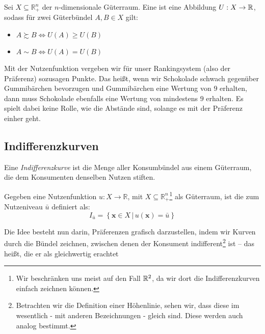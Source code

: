 \begin{definition} \label{def:nutzenfunktion}
	Sei $X \subseteq \mathbb{R}^n_+$ der $n$-dimensionale Güterraum. Eine  ist eine Abbildung $U: X \rightarrow \mathbb{R}$, sodass für zwei Güterbündel $A, B \in X$ gilt:
	\begin{itemize}
		\item $A \succsim B \iff U(A) \ge U(B)$
		\item $A \sim B \iff U(A) = U(B)$
	\end{itemize}
\end{definition}

Mit der Nutzenfunktion vergeben wir für unser Rankingsystem (also der Präferenz) sozusagen Punkte.
Das heißt, wenn wir Schokolade schwach gegenüber Gummibärchen bevorzugen und Gummibärchen eine Wertung von $9$ erhalten, dann muss Schokolade ebenfalls eine Wertung von mindestens $9$ erhalten.
Es spielt dabei keine Rolle, wie die Abstände sind, solange es mit der Präferenz einher geht.


\subsection{Indifferenzkurven}
Eine \emph{Indifferenzkurve} ist die Menge aller Konsumbündel aus einem Güterraum, die dem Konsumenten denselben Nutzen stiften.

\begin{definition}[Indifferenzkurve]
	Gegeben eine Nutzenfunktion \( u: X \rightarrow \mathbb{R} \), mit \( X \subseteq \mathbb{R}_+^n \)\footnote{Wir beschränken uns meist auf den Fall $\mathbb{R}^2$, da wir dort die Indifferenzkurven einfach zeichnen können.} als Güterraum, ist die   zum Nutzeniveau \( \bar{u} \) definiert als:
	\[
		I_{\bar{u}} = \left\{ \mathbf{x} \in X \,\bigg|\, u(\mathbf{x}) = \bar{u} \right\}
	\]
\end{definition}

Die Idee besteht nun darin, Präferenzen grafisch darzustellen, indem wir
Kurven durch die Bündel zeichnen, zwischen denen der Konsument
indifferent\footnote{Betrachten wir die Definition einer Höhenlinie, sehen wir, dass diese im wesentlich - mit anderen Bezeichnungen - gleich sind. Diese werden auch analog bestimmt.} ist – das heißt, die er als gleichwertig erachtet


